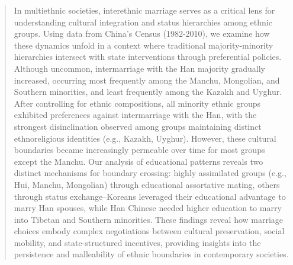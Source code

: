 \sloppy

\begin{abstract}
    In multiethnic societies, interethnic marriage serves as a critical lens for
    understanding cultural integration and status hierarchies among ethnic
    groups.
    Using data from China's Census (1982-2010), we examine how these dynamics
    unfold in a context where traditional majority-minority hierarchies
    intersect with state interventions through preferential policies.
    Although uncommon, intermarriage with the Han majority gradually increased,
    occurring most frequently among the Manchu, Mongolian, and Southern
    minorities, and least frequently among the Kazakh and Uyghur.
    After controlling for ethnic compositions, all minority ethnic groups
    exhibited preferences against intermarriage with the Han, with the strongest
    disinclination observed among groups maintaining distinct ethnoreligious
    identities (e.g., Kazakh, Uyghur).
    However, these cultural boundaries became increasingly permeable over time
    for most groups except the Manchu.
    Our analysis of educational patterns reveals two distinct mechanisms for
    boundary crossing: highly assimilated groups (e.g., Hui, Manchu, Mongolian)
    through educational assortative mating, others through status
    exchange--Koreans leveraged their educational advantage to marry Han
    spouses, while Han Chinese needed higher education to marry into Tibetan and
    Southern minorities.
    These findings reveal how marriage choices embody complex negotiations
    between cultural preservation, social mobility, and state-structured
    incentives, providing insights into the persistence and malleability of
    ethnic boundaries in contemporary societies.
\end{abstract}